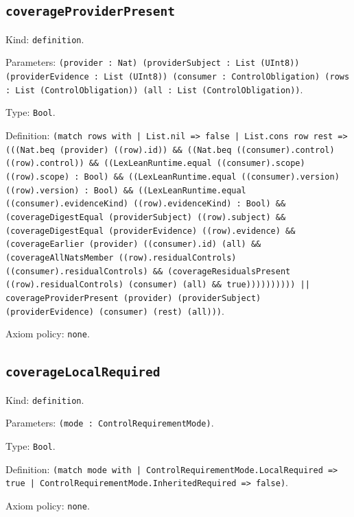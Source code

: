 \documentclass[11pt]{article}
\begin{document}
\subsection*{\texttt{coverageProviderPresent}}
\noindent Kind: \texttt{definition}.\par
\noindent Parameters: \texttt{(provider : Nat) (providerSubject : List (UInt8)) (providerEvidence : List (UInt8)) (consumer : ControlObligation) (rows : List (ControlObligation)) (all : List (ControlObligation))}.\par
\noindent Type: \texttt{Bool}.\par
\noindent Definition: \texttt{(match rows with | List.nil => false | List.cons row rest => (((Nat.beq (provider) ((row).id)) \&\& ((Nat.beq ((consumer).control) ((row).control)) \&\& ((LexLeanRuntime.equal ((consumer).scope) ((row).scope) : Bool) \&\& ((LexLeanRuntime.equal ((consumer).version) ((row).version) : Bool) \&\& ((LexLeanRuntime.equal ((consumer).evidenceKind) ((row).evidenceKind) : Bool) \&\& (coverageDigestEqual (providerSubject) ((row).subject) \&\& (coverageDigestEqual (providerEvidence) ((row).evidence) \&\& (coverageEarlier (provider) ((consumer).id) (all) \&\& (coverageAllNatsMember ((row).residualControls) ((consumer).residualControls) \&\& (coverageResidualsPresent ((row).residualControls) (consumer) (all) \&\& true)))))))))) || coverageProviderPresent (provider) (providerSubject) (providerEvidence) (consumer) (rest) (all)))}.\par
\noindent Axiom policy: \texttt{none}.\par
\subsection*{\texttt{coverageLocalRequired}}
\noindent Kind: \texttt{definition}.\par
\noindent Parameters: \texttt{(mode : ControlRequirementMode)}.\par
\noindent Type: \texttt{Bool}.\par
\noindent Definition: \texttt{(match mode with | ControlRequirementMode.LocalRequired => true | ControlRequirementMode.InheritedRequired => false)}.\par
\noindent Axiom policy: \texttt{none}.\par
\end{document}
